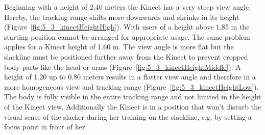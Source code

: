 Beginning with a height of 2.40 meters the Kinect has a very steep view angle.
Hereby, the tracking range shifts more downwards and shrinks in its height (Figure~\ref{fig:5_3_kinectHeightHigh}).
With users of a height above 1.85 m the starting position cannot be arranged for appropriate usage.
The same problem applies for a Kinect height of 1.60 m. The view angle is more flat but the slackline must be positioned further away from the Kinect to prevent cropped body parts like the head or arms (Figure~\ref{fig:5_3_kinectHeightMiddle}).
A height of 1.20 up to 0.80 meters results in a flatter view angle and therefore in a more homogeneous view and tracking range (Figure~\ref{fig:5_3_kinectHeightLow}).
The body is fully visible in the entire tracking range and not limited in the height of the Kinect view.
Additionally the Kinect is in a position that won't disturb the visual sense of the slacker during her training on the slackline, e.g. by setting a focus point in front of her.

